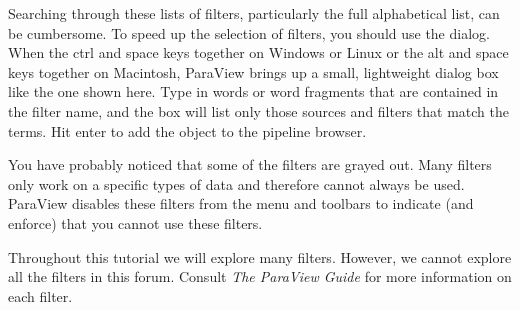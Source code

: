 Searching through these lists of filters, particularly the full
alphabetical list, can be cumbersome.  To speed up the selection of
filters, you should use the  dialog.  When the ctrl
and space keys together on Windows or Linux or the alt and space keys
together on Macintosh, ParaView brings up a small, lightweight dialog box
like the one shown here.  Type in words or word fragments that are
contained in the filter name, and the box will list only those sources and
filters that match the terms.  Hit enter to add the object to the pipeline
browser.

You have probably noticed that some of the filters are grayed out.  Many
filters only work on a specific types of data and therefore cannot always
be used.  ParaView disables these filters from the menu and toolbars to
indicate (and enforce) that you cannot use these filters.

Throughout this tutorial we will explore many filters.  However, we cannot
explore all the filters in this forum.  Consult \emph{The ParaView Guide}
for more information on each filter.

